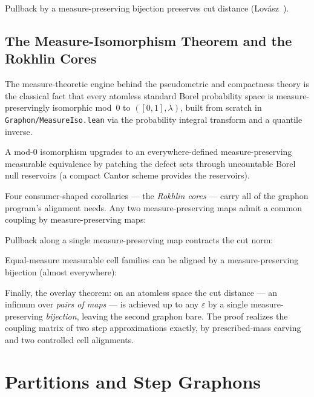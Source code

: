 
Pullback by a measure-preserving bijection preserves cut distance
(Lov\'asz~\cite[Section~8.2]{lovasz2012}).


\section{The Measure-Isomorphism Theorem and the Rokhlin Cores}

The measure-theoretic engine behind the pseudometric and compactness theory is the
classical fact that every atomless standard Borel probability space is
measure-preservingly isomorphic mod~0 to $([0,1],\lambda)$, built from scratch in
\texttt{Graphon/MeasureIso.lean} via the probability integral transform and a
quantile inverse.


A mod-0 isomorphism upgrades to an everywhere-defined measure-preserving measurable
equivalence by patching the defect sets through uncountable Borel null reservoirs
(a compact Cantor scheme provides the reservoirs).


Four consumer-shaped corollaries --- the \emph{Rokhlin cores} --- carry all of the
graphon program's alignment needs.  Any two measure-preserving maps admit a common
coupling by measure-preserving maps:


Pullback along a single measure-preserving map contracts the cut norm:


Equal-measure measurable cell families can be aligned by a measure-preserving
bijection (almost everywhere):


Finally, the overlay theorem: on an atomless space the cut distance --- an infimum
over \emph{pairs of maps} --- is achieved up to any $\varepsilon$ by a single
measure-preserving \emph{bijection}, leaving the second graphon bare.  The proof
realizes the coupling matrix of two step approximations exactly, by prescribed-mass
carving and two controlled cell alignments.



\chapter{Partitions and Step Graphons}

